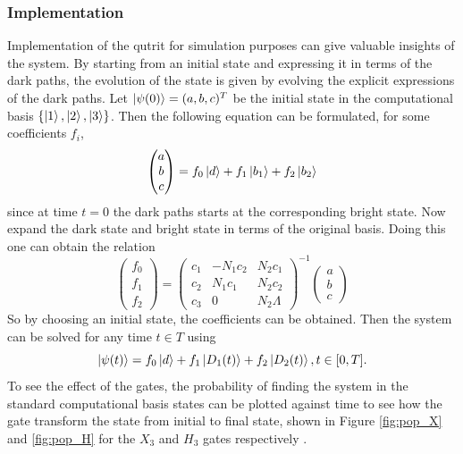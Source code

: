 \subsubsection{Implementation}
Implementation of the qutrit for simulation purposes can give valuable insights of the system. By starting from an initial state and expressing it in terms of the dark paths, the evolution of the state is given by evolving the explicit expressions of the dark paths. Let $\ket{\psi(0)} = (a,b,c)^T$ be the initial state in the computational basis $\{\ket{1},\ket{2},\ket{3}\}$. Then the following equation can be formulated, for some coefficients $f_i$,
\begin{equation}
\begin{pmatrix}
a\\
b\\
c
\end{pmatrix}
= f_0 \ket{d} + f_1\ket{b_1} + f_2\ket{b_2}
\end{equation}
since at time $t = 0$ the dark paths starts at the corresponding bright state.
Now expand the dark state and bright state in terms of the original basis. Doing this one can obtain the relation
\begin{equation}
\begin{pmatrix}
f_0\\
f_1\\
f_2
\end{pmatrix} = \begin{pmatrix}
c_1 & -N_1 c_2 & N_2 c_1
\\
c_2 & N_1 c_1 & N_2 c_2
\\
c_3 & 0 & N_2 \Lambda
\end{pmatrix}^{-1}\begin{pmatrix}
a\\
b\\
c
\end{pmatrix}
\end{equation}
So by choosing an initial state, the coefficients can be obtained.
Then the system can be solved for any time $t \in T$ using
\begin{equation}
\label{eq:expl-time}
\ket{\psi(t)} = f_0\ket{d} + f_1\ket{D_1(t)} + f_2\ket{D_2(t)}, t \in [0,T].
\end{equation}
To see the effect of the gates, the probability of finding the system in the standard computational basis states can be plotted against time to see how the gate transform the state from initial to final state, shown in Figure \ref{fig:pop_X} and \ref{fig:pop_H} for the $X_3$ and $H_3$ gates respectively . 
